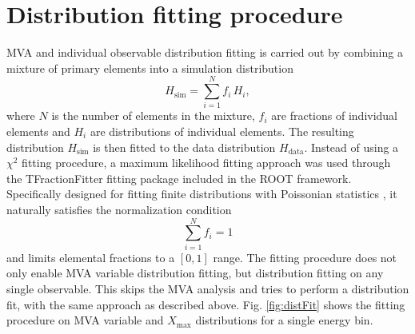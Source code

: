 \documentclass[12pt,a4paper]{report}
\begin{document}
\section{Distribution fitting procedure} \label{ch:distrib-fit}
MVA and individual observable distribution fitting is carried out by combining a mixture of primary elements into a simulation distribution
\begin{equation}\label{eq:simhistSum}
H_{\textrm{sim}} = \displaystyle\sum_{i=1}^{N}{f_i\, H_i},
\end{equation}
where $N$ is the number of elements in the mixture, $f_i$ are fractions of individual elements and $H_i$ are distributions of individual elements. The resulting distribution $H_{\textrm{sim}}$ is then fitted to the data distribution $H_{\textrm{data}}$. 
Instead of using a $\chi^2$ fitting procedure, a maximum likelihood fitting approach was used through the TFractionFitter fitting package \cite{tfractionfitter} included in the ROOT framework. Specifically designed for fitting finite distributions with Poissonian statistics \cite{finiteMCfitting}, it naturally satisfies the normalization condition
\begin{equation}
\displaystyle\sum_{i=1}^{N}{f_i} = 1
\end{equation}
and limits elemental fractions to a $[0,1]$ range. The fitting procedure does not only enable MVA variable distribution fitting, but distribution fitting on any single observable. This skips the MVA analysis and tries to perform a distribution fit, with the same approach as described above. Fig. \ref{fig:distFit} shows the fitting procedure on MVA variable and $X_{\textrm{max}}$ distributions for a single energy bin.
%
\end{document}
